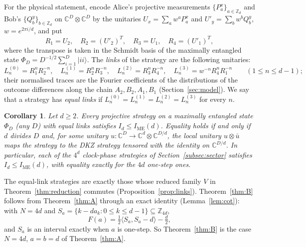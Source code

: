 \documentclass[11pt]{amsart}
\newtheorem{introcor}[introthm]{Corollary}
\theoremstyle{definition}
\theoremstyle{remark}
\newcommand{\Z}{\mathbb{Z}}
\newcommand{\C}{\mathbb{C}}
\newcommand{\ip}[2]{\langle #1,#2\rangle}
\newcommand{\IME}{I_{\mathrm{ME}}}
\begin{document}
For the physical statement, encode Alice's projective measurements $\{P^x_a\}_{a\in\Z_d}$ and Bob's
$\{Q^y_b\}_{b\in\Z_d}$ on $\C^D\otimes\C^D$ by the unitaries $U_x=\sum_aw^aP^x_a$ and $U'_y=\sum_bw^bQ^y_b$,
$w=e^{2\pi i/d}$, and put
\begin{equation}\label{eq:chainR}
R_1=U_2,\quad R_2=(U'_2)^T,\quad R_3=U_1,\quad R_4=(U'_1)^T,
\end{equation}
where the transpose is taken in the Schmidt basis of the maximally entangled state
$\Phi_D=D^{-1/2}\sum_{i=1}^D|ii\rangle$. The \emph{links} of the strategy are the following unitaries:
\[
L^{(0)}_n=R_1^nR_2^{-n},\quad L^{(1)}_n=R_2^nR_3^{-n},\quad L^{(2)}_n=R_3^nR_4^{-n},\quad
L^{(3)}_n=w^{-n}R_4^nR_1^{-n}\qquad(1\le n\le d-1);
\]
their normalised traces are the Fourier coefficients of the distributions of the outcome differences along the
chain $A_2,B_2,A_1,B_1$ (Section~\ref{sec:model}). We say that a strategy has \emph{equal links} if
$L^{(0)}_n=L^{(1)}_n=L^{(2)}_n=L^{(3)}_n$ for every $n$.

\begin{introcor}\label{cor:C}
Let $d\ge2$. Every projective strategy on a maximally entangled state $\Phi_D$ (any $D$) with equal links
satisfies $I_d\le\IME(d)$. Equality holds if and only if $d$ divides $D$ and, for some unitary
$u\colon\C^D\to\C^d\otimes\C^{D/d}$, the local unitary $u\otimes\bar u$ maps the strategy to the DKZ strategy
tensored with the identity on $\C^{D/d}$. In particular, each of the $4^d$ clock-phase strategies of
Section~\ref{subsec:sector} satisfies $I_d\le\IME(d)$, with equality exactly for the $4d$ one-step ones.
\end{introcor}

The equal-link strategies are exactly those whose reduced family $V$ in Theorem~\ref{thm:reduction} commutes
(Proposition~\ref{prop:links}). Theorem~\ref{thm:B} follows from Theorem~\ref{thm:A} through an exact identity
(Lemma~\ref{lem:cot}): with $N=4d$ and $S_a=\{k-da_k:0\le k\le d-1\}\subseteq\Z_{4d}$,
\[
F(a)=\tfrac12\ip{S_a}{S_a-d}-\tfrac d2 ,
\]
and $S_a$ is an interval exactly when $a$ is one-step. So Theorem~\ref{thm:B} is the case $N=4d$, $a=b=d$ of
Theorem~\ref{thm:A}.
\end{document}
